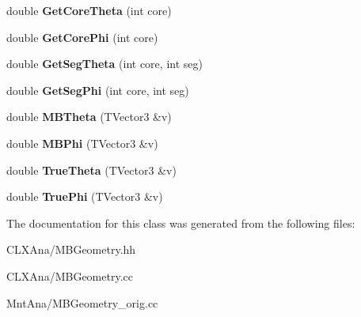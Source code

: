 \begin{DoxyCompactItemize}
double {\bfseries Get\+Core\+Theta} (int core)
\item 
\mbox{\label{class_m_b_geometry_a39f685610ae0e68e547a46f8ef992599}} 
double {\bfseries Get\+Core\+Phi} (int core)
\item 
\mbox{\label{class_m_b_geometry_a49cdf742a2902fc85f0b24dfffa554a8}} 
double {\bfseries Get\+Seg\+Theta} (int core, int seg)
\item 
\mbox{\label{class_m_b_geometry_a575ddd6022d2d686a83ebce3195b6c50}} 
double {\bfseries Get\+Seg\+Phi} (int core, int seg)
\item 
\mbox{\label{class_m_b_geometry_af4adfb858000405b21f79a6bf10c3c37}} 
double {\bfseries M\+B\+Theta} (T\+Vector3 \&v)
\item 
\mbox{\label{class_m_b_geometry_a399568d67bb83801ef6a2dbe963a535e}} 
double {\bfseries M\+B\+Phi} (T\+Vector3 \&v)
\item 
\mbox{\label{class_m_b_geometry_afd393f9db7182de7fb19f0c934edb383}} 
double {\bfseries True\+Theta} (T\+Vector3 \&v)
\item 
\mbox{\label{class_m_b_geometry_a718d9c7fcc4a5fb8b9ecaabdc7a0503f}} 
double {\bfseries True\+Phi} (T\+Vector3 \&v)
\end{DoxyCompactItemize}


The documentation for this class was generated from the following files\+:\begin{DoxyCompactItemize}
\item 
C\+L\+X\+Ana/M\+B\+Geometry.\+hh\item 
C\+L\+X\+Ana/M\+B\+Geometry.\+cc\item 
Mnt\+Ana/M\+B\+Geometry\+\_\+orig.\+cc\end{DoxyCompactItemize}
